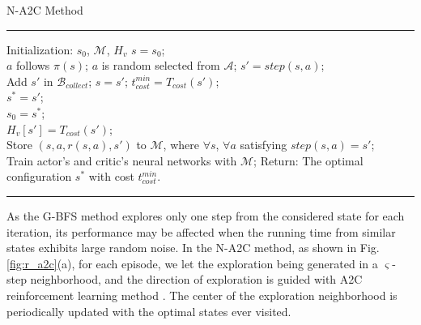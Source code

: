 \begin{algorithm}[htb]
\caption{N-A2C Method}
\label{alg:r_a2c}
\vspace{.01cm}
\hrule
    \begin{algorithmic}[1]
    \vspace{.2cm}
    \STATE Initialization: {$s_0$, $\mathcal{M}$, $H_v$}
            \STATE$s = s_0$; \\
                    \STATE $a$ follows $\pi(s)$;
                \ELSE
                    \STATE $a$ is random selected from $\mathcal{A}$;
                \ENDIF
                \STATE $s'=step(s,a)$; \\
                    \STATE Add $s'$ in $\mathcal{B}_{collect}$;
                \ENDIF
                \STATE $s = s'$;
            \ENDFOR
        \ENDWHILE
                \STATE $t_{cost}^{min} = T_{cost}(s')$; \\
                \STATE $s^* = s'$; \\
                \STATE $s_0=s^*$; \\
            \ENDIF
            \STATE $H_v[s'] = T_{cost}(s')$; \\
            \STATE Store $(s, a, r(s,a), s')$ to $\mathcal{M}$, where $\forall s$, $\forall a$ satisfying $step(s,a) = s'$; \\
            \STATE Train actor's and critic's neural networks with $\mathcal{M}$;
        \ENDFOR
    \ENDFOR
    \STATE Return: The optimal configuration $s^*$ with cost $t_{cost}^{min}$.
    \end{algorithmic}
    \hrule
\end{algorithm}

As the G-BFS method explores only one step from the considered state for each iteration, its performance may be affected when the running time from similar states exhibits large random noise. In the N-A2C method, as shown in Fig. \ref{fig:r_a2c}(a), for each episode, we let the exploration being generated in a $\varsigma$-step neighborhood, and the direction of exploration is guided with A2C reinforcement learning method \cite{bhatnagar2009natural}. The center of the exploration neighborhood is periodically updated with the optimal states ever visited.



